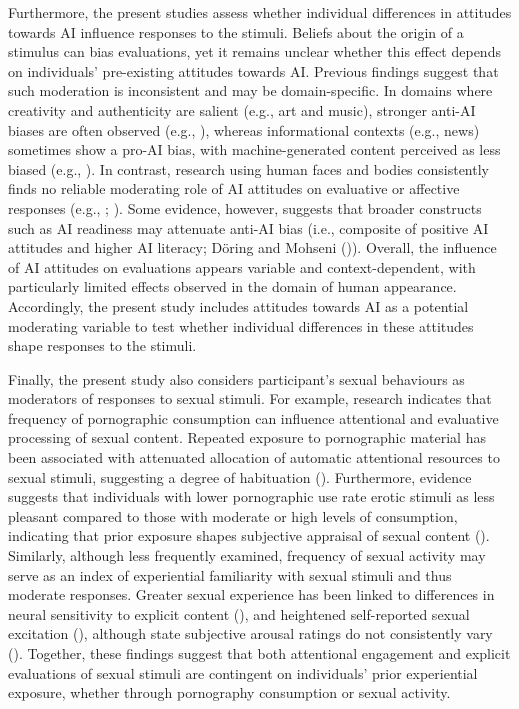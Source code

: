 \documentclass[
  jou,
  floatsintext,
  longtable,
  nolmodern,
  notxfonts,
  notimes,
  colorlinks=true,linkcolor=blue,citecolor=blue,urlcolor=blue]{apa7}
\begin{document}
Furthermore, the present studies assess whether individual differences
in attitudes towards AI influence responses to the stimuli. Beliefs
about the origin of a stimulus can bias evaluations, yet it remains
unclear whether this effect depends on individuals' pre-existing
attitudes towards AI. Previous findings suggest that such moderation is
inconsistent and may be domain-specific. In domains where creativity and
authenticity are salient (e.g., art and music), stronger anti-AI biases
are often observed (e.g., ), whereas informational contexts (e.g., news) sometimes show a
pro-AI bias, with machine-generated content perceived as less biased
(e.g., ). In contrast,
research using human faces and bodies consistently finds no reliable
moderating role of AI attitudes on evaluative or affective responses
(e.g., ;
). Some evidence,
however, suggests that broader constructs such as AI readiness may
attenuate anti-AI bias (i.e., composite of positive AI attitudes and
higher AI literacy; Döring and Mohseni
()). Overall, the influence of AI
attitudes on evaluations appears variable and context-dependent, with
particularly limited effects observed in the domain of human appearance.
Accordingly, the present study includes attitudes towards AI as a
potential moderating variable to test whether individual differences in
these attitudes shape responses to the stimuli.

Finally, the present study also considers participant's sexual
behaviours as moderators of responses to sexual stimuli. For example,
research indicates that frequency of pornographic consumption can
influence attentional and evaluative processing of sexual content.
Repeated exposure to pornographic material has been associated with
attenuated allocation of automatic attentional resources to sexual
stimuli, suggesting a degree of habituation
(). Furthermore,
evidence suggests that individuals with lower pornographic use rate
erotic stimuli as less pleasant compared to those with moderate or high
levels of consumption, indicating that prior exposure shapes subjective
appraisal of sexual content
().
Similarly, although less frequently examined, frequency of sexual
activity may serve as an index of experiential familiarity with sexual
stimuli and thus moderate responses. Greater sexual experience has been
linked to differences in neural sensitivity to explicit content
(), and
heightened self-reported sexual excitation
(),
although state subjective arousal ratings do not consistently vary
(). Together, these
findings suggest that both attentional engagement and explicit
evaluations of sexual stimuli are contingent on individuals' prior
experiential exposure, whether through pornography consumption or sexual
activity.
\end{document}
